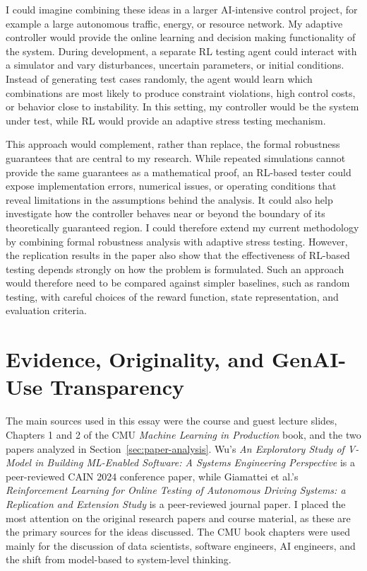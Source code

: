 \documentclass[11pt,a4paper]{article}
\begin{document}
I could imagine combining these ideas in a larger AI-intensive control project, for example a large autonomous traffic, energy, or resource network. My adaptive controller would provide the online learning and decision making functionality of the system. During development, a separate RL testing agent could interact with a simulator and vary disturbances, uncertain parameters, or initial conditions. Instead of generating test cases randomly, the agent would learn which combinations are most likely to produce constraint violations, high control costs, or behavior close to instability. In this setting, my controller would be the system under test, while RL would provide an adaptive stress testing mechanism.

This approach would complement, rather than replace, the formal robustness guarantees that are central to my research. While repeated simulations cannot provide the same guarantees as a mathematical proof, an RL-based tester could expose implementation errors, numerical issues, or operating conditions that reveal limitations in the assumptions behind the analysis. It could also help investigate how the controller behaves near or beyond the boundary of its theoretically guaranteed region. I could therefore extend my current methodology by combining formal robustness analysis with adaptive stress testing. However, the replication results in the paper also show that the effectiveness of RL-based testing depends strongly on how the problem is formulated. Such an approach would therefore need to be compared against simpler baselines, such as random testing, with careful choices of the reward function, state representation, and evaluation criteria.




\section{Evidence, Originality, and GenAI-Use Transparency}


The main sources used in this essay were the course and guest lecture slides, Chapters 1 and 2 of the CMU \emph{Machine Learning in Production} book, and the two papers analyzed in Section~\ref{sec:paper-analysis}. Wu's \emph{An Exploratory Study of V-Model in Building ML-Enabled Software: A Systems Engineering Perspective} is a peer-reviewed CAIN 2024 conference paper, while Giamattei et al.'s \emph{Reinforcement Learning for Online Testing of Autonomous Driving Systems: a Replication and Extension Study} is a peer-reviewed journal paper. I placed the most attention on the original research papers and course material, as these are the primary sources for the ideas discussed. The CMU book chapters were used mainly for the discussion of data scientists, software engineers, AI engineers, and the shift from model-based to system-level thinking.
\end{document}
